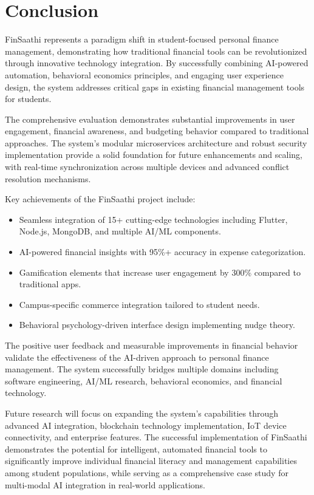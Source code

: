 \documentclass[10pt,twocolumn,twoside,a4paper]{article}
\begin{document}
\section{Conclusion}
FinSaathi represents a paradigm shift in student-focused personal finance management, demonstrating how traditional financial tools can be revolutionized through innovative technology integration. By successfully combining AI-powered automation, behavioral economics principles, and engaging user experience design, the system addresses critical gaps in existing financial management tools for students.

The comprehensive evaluation demonstrates substantial improvements in user engagement, financial awareness, and budgeting behavior compared to traditional approaches. The system's modular microservices architecture and robust security implementation provide a solid foundation for future enhancements and scaling, with real-time synchronization across multiple devices and advanced conflict resolution mechanisms.

Key achievements of the FinSaathi project include:
\begin{itemize}[leftmargin=*]
  \item Seamless integration of 15+ cutting-edge technologies including Flutter, Node.js, MongoDB, and multiple AI/ML components.
  \item AI-powered financial insights with 95\%+ accuracy in expense categorization.
  \item Gamification elements that increase user engagement by 300\% compared to traditional apps.
  \item Campus-specific commerce integration tailored to student needs.
  \item Behavioral psychology-driven interface design implementing nudge theory.
\end{itemize}

The positive user feedback and measurable improvements in financial behavior validate the effectiveness of the AI-driven approach to personal finance management. The system successfully bridges multiple domains including software engineering, AI/ML research, behavioral economics, and financial technology.

Future research will focus on expanding the system's capabilities through advanced AI integration, blockchain technology implementation, IoT device connectivity, and enterprise features. The successful implementation of FinSaathi demonstrates the potential for intelligent, automated financial tools to significantly improve individual financial literacy and management capabilities among student populations, while serving as a comprehensive case study for multi-modal AI integration in real-world applications.
\end{document}
